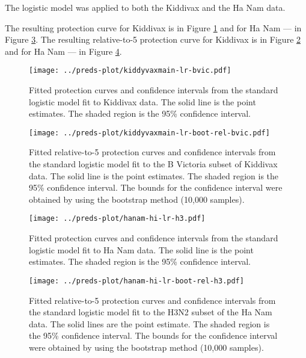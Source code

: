 The logistic model was applied to both the Kiddivax and the Ha Nam data.

The resulting protection curve for Kiddivax is in Figure \ref{fig:kiddyvaxmain-prot-lr} and for Ha Nam --- in Figure \ref{fig:hanam-prot-lr}. The resulting relative-to-5 protection curve for Kiddivax is in Figure \ref{fig:kiddyvaxmain-prot-rel-lr-boot} and for Ha Nam --- in Figure \ref{fig:hanam-prot-rel-lr-boot}.

\begin{figure}[htp]
    \centering
    \texttt{[image: ../preds-plot/kiddyvaxmain-lr-bvic.pdf]}
    \caption{
        Fitted protection curves and confidence intervals from the standard logistic model fit to Kiddivax data. The solid line is the point estimates. The shaded region is the 95\% confidence interval.
    }
    \label{fig:kiddyvaxmain-prot-lr}
\end{figure}

\begin{figure}[htp]
    \centering
    \texttt{[image: ../preds-plot/kiddyvaxmain-lr-boot-rel-bvic.pdf]}
    \caption{
        Fitted relative-to-5 protection curves and confidence intervals from the standard logistic model fit to the B Victoria subset of Kiddivax data. The solid line is the point estimates. The shaded region is the 95\% confidence interval. The bounds for the confidence interval were obtained by using the bootstrap method (10,000 samples).
    }
    \label{fig:kiddyvaxmain-prot-rel-lr-boot}
\end{figure}

\begin{figure}[htp]
    \centering
    \texttt{[image: ../preds-plot/hanam-hi-lr-h3.pdf]}
    \caption{
        Fitted protection curves and confidence intervals from the standard logistic model fit to Ha Nam data. The solid line is the point estimates. The shaded region is the 95\% confidence interval.
    }
    \label{fig:hanam-prot-lr}
\end{figure}

\begin{figure}[htp]
    \centering
    \texttt{[image: ../preds-plot/hanam-hi-lr-boot-rel-h3.pdf]}
    \caption{
        Fitted relative-to-5 protection curves and confidence intervals from the standard logistic model fit to the H3N2 subset of the Ha Nam data. The solid lines are the point estimate. The shaded region is the 95\% confidence interval. The bounds for the confidence interval were obtained by using the bootstrap method (10,000 samples).
    }
    \label{fig:hanam-prot-rel-lr-boot}
\end{figure}


